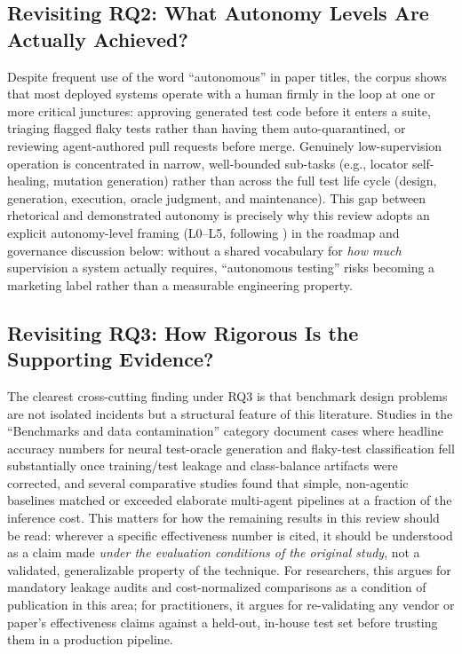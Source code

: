 \subsection{Revisiting RQ2: What Autonomy Levels Are Actually Achieved?}
Despite frequent use of the word ``autonomous'' in paper titles, the
corpus shows that most deployed systems operate with a human firmly in
the loop at one or more critical junctures: approving generated test
code before it enters a suite, triaging flagged flaky tests rather than
having them auto-quarantined, or reviewing agent-authored pull requests
before merge. Genuinely low-supervision operation is concentrated in
narrow, well-bounded sub-tasks (e.g., locator self-healing, mutation
generation) rather than across the full test life cycle (design,
generation, execution, oracle judgment, and maintenance). This gap
between rhetorical and demonstrated autonomy is precisely why this
review adopts an explicit autonomy-level framing (L0--L5, following
\cite{feng2025autonomylevels}) in the roadmap and governance discussion
below: without a shared vocabulary for \emph{how much} supervision a
system actually requires, ``autonomous testing'' risks becoming a
marketing label rather than a measurable engineering property.

\subsection{Revisiting RQ3: How Rigorous Is the Supporting Evidence?}
The clearest cross-cutting finding under RQ3 is that benchmark design
problems are not isolated incidents but a structural feature of this
literature. Studies in the ``Benchmarks and data contamination''
category document cases where headline accuracy numbers for neural
test-oracle generation and flaky-test classification fell substantially
once training/test leakage and class-balance artifacts were corrected,
and several comparative studies found that simple, non-agentic
baselines matched or exceeded elaborate multi-agent pipelines at a
fraction of the inference cost. This matters for how the remaining
results in this review should be read: wherever a specific effectiveness
number is cited, it should be understood as a claim made \emph{under
the evaluation conditions of the original study}, not a validated,
generalizable property of the technique. For researchers, this argues
for mandatory leakage audits and cost-normalized comparisons as a
condition of publication in this area; for practitioners, it argues
for re-validating any vendor or paper's effectiveness claims against a
held-out, in-house test set before trusting them in a production
pipeline.

